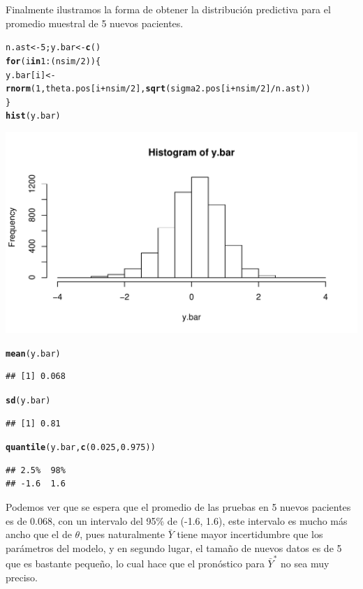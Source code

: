 \documentclass[10pt,openright]{book}\usepackage[]{graphicx}\usepackage[]{color}
\makeatletter
\def\maxwidth{ %
  \ifdim\Gin@nat@width>\linewidth
    \linewidth
  \else
    \Gin@nat@width
  \fi
}
\newcommand{\hlnum}[1]{\textcolor[rgb]{0.686,0.059,0.569}{#1}}%
\newcommand{\hlopt}[1]{\textcolor[rgb]{0,0,0}{#1}}%
\newcommand{\hlstd}[1]{\textcolor[rgb]{0.345,0.345,0.345}{#1}}%
\newcommand{\hlkwa}[1]{\textcolor[rgb]{0.161,0.373,0.58}{\textbf{#1}}}%
\newcommand{\hlkwb}[1]{\textcolor[rgb]{0.69,0.353,0.396}{#1}}%
\newcommand{\hlkwd}[1]{\textcolor[rgb]{0.737,0.353,0.396}{\textbf{#1}}}%
\newenvironment{kframe}{%
 \def\at@end@of@kframe{}%
 \ifinner\ifhmode%
  \def\at@end@of@kframe{\end{minipage}}%
  \begin{minipage}{\columnwidth}%
 \fi\fi%
 \def\FrameCommand##1{\hskip\@totalleftmargin \hskip-\fboxsep
 \colorbox{shadecolor}{##1}\hskip-\fboxsep
     \hskip-\linewidth \hskip-\@totalleftmargin \hskip\columnwidth}%
 \MakeFramed {\advance\hsize-\width
   \@totalleftmargin\z@ \linewidth\hsize
   \@setminipage}}%
 {\par\unskip\endMakeFramed%
 \at@end@of@kframe}
\newenvironment{knitrout}{}{} %
\makeatother
\begin{document}
\begin{Eje}
Finalmente ilustramos la forma de obtener la distribuci\'on predictiva para el promedio muestral de 5 nuevos pacientes. 
\begin{knitrout}
\color{fgcolor}\begin{kframe}
\begin{alltt}
\hlstd{n.ast} \hlkwb{<-} \hlnum{5}\hlstd{; y.bar} \hlkwb{<-} \hlkwd{c}\hlstd{()}
\hlkwa{for}\hlstd{(i} \hlkwa{in} \hlnum{1}\hlopt{:}\hlstd{(nsim}\hlopt{/}\hlnum{2}\hlstd{))\{}
  \hlstd{y.bar[i]} \hlkwb{<-} \hlkwd{rnorm}\hlstd{(}\hlnum{1}\hlstd{,theta.pos[i}\hlopt{+}\hlstd{nsim}\hlopt{/}\hlnum{2}\hlstd{],}\hlkwd{sqrt}\hlstd{(sigma2.pos[i}\hlopt{+}\hlstd{nsim}\hlopt{/}\hlnum{2}\hlstd{]}\hlopt{/}\hlstd{n.ast))}
\hlstd{\}}
\hlkwd{hist}\hlstd{(y.bar)}
\end{alltt}
\end{kframe}
\includegraphics[width=\maxwidth]{figure/unnamed-chunk-36-1} 
\begin{kframe}\begin{alltt}
\hlkwd{mean}\hlstd{(y.bar)}
\end{alltt}
\begin{verbatim}
## [1] 0.068
\end{verbatim}
\begin{alltt}
\hlkwd{sd}\hlstd{(y.bar)}
\end{alltt}
\begin{verbatim}
## [1] 0.81
\end{verbatim}
\begin{alltt}
\hlkwd{quantile}\hlstd{(y.bar,}\hlkwd{c}\hlstd{(}\hlnum{0.025}\hlstd{,}\hlnum{0.975}\hlstd{))}
\end{alltt}
\begin{verbatim}
## 2.5%  98% 
## -1.6  1.6
\end{verbatim}
\end{kframe}
\end{knitrout}
Podemos ver que se espera que el promedio de las pruebas en 5 nuevos pacientes es de 0.068, con un intervalo del 95\% de (-1.6, 1.6), este intervalo es mucho m\'as ancho que el de $\theta$, pues naturalmente $\bar{Y}$ tiene mayor incertidumbre que los par\'ametros del modelo, y en segundo lugar, el tama\~no de nuevos datos es de 5 que es bastante  peque\~no, lo cual hace que el pron\'ostico para $\bar{Y}^*$ no sea muy preciso.
\end{Eje}
\end{document}
